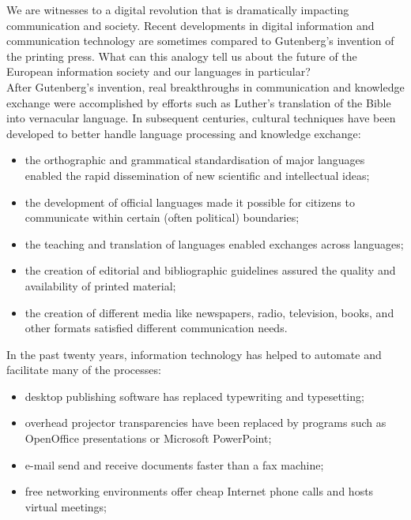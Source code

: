\begin{multicols}{2}

We are witnesses to a digital revolution that is dramatically impacting
communication and society. Recent developments in digital information and
communication technology are sometimes compared to Gutenberg’s invention of the
printing press. What can this analogy tell us about the future of the European
information society and our languages in particular?\\
After Gutenberg’s invention, real breakthroughs in communication and knowledge
exchange were accomplished by efforts such as Luther’s translation of the Bible
into vernacular language. In subsequent centuries, cultural techniques have
been developed to better handle language processing and knowledge exchange:
\begin{itemize}
\item the orthographic and grammatical standardisation of major languages enabled the
rapid dissemination of new scientific and intellectual ideas;

\item the development of official languages made it possible for citizens to
communicate within certain (often political) boundaries;

\item the teaching and translation of languages enabled exchanges across languages;

\item the creation of editorial and bibliographic guidelines assured the quality and
availability of printed material;

\item the creation of different media like newspapers, radio, television, books, and
other formats satisfied different communication needs.
\end{itemize}
In the past twenty years, information technology has helped to automate and
facilitate many of the processes:
\begin{itemize}
\item desktop publishing software has replaced typewriting and typesetting;

\item overhead projector transparencies have been replaced by programs such as
OpenOffice presentations or Microsoft PowerPoint;

\item e-mail send and receive documents faster than a fax machine;

\item free networking environments offer cheap Internet phone calls and hosts virtual
meetings;


\end{itemize}
\end{multicols}
